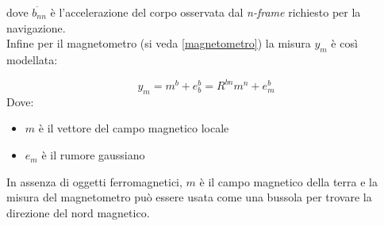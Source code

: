dove $\ddot{b_{nn}}$ è l'accelerazione del corpo osservata dal \textit{n-frame} richiesto per la navigazione.\\

Infine per il magnetometro (si veda \ref{magnetometro}) la misura $y_m$ è così modellata:

\begin{equation}
y_m = m^b + e_b^b = R^{bn} m^n + e_m^b
\end{equation}
Dove:
\begin{itemize}
	\item $m$ è il vettore del campo magnetico locale
	\item $e_m$ è il rumore gaussiano
\end{itemize}
In assenza di oggetti ferromagnetici, $m$ è il campo magnetico della terra e la misura del magnetometro può essere usata come una bussola per trovare la direzione del nord magnetico.







